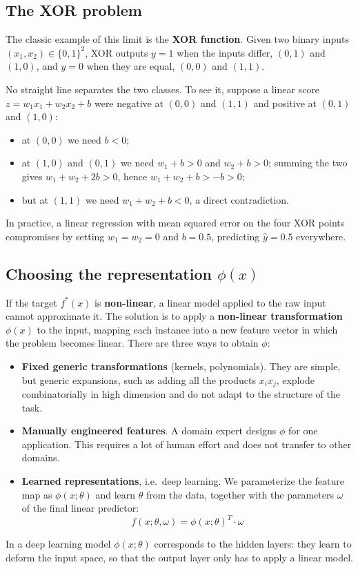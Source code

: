 \subsection{The XOR problem}
The classic example of this limit is the \textbf{XOR function}. Given two binary
inputs $(x_1, x_2) \in \{0,1\}^2$, XOR outputs $y = 1$ when the inputs differ,
$(0,1)$ and $(1,0)$, and $y = 0$ when they are equal, $(0,0)$ and $(1,1)$.

No straight line separates the two classes. To see it, suppose a linear score
$z = w_1 x_1 + w_2 x_2 + b$ were negative at $(0,0)$ and $(1,1)$ and positive at
$(0,1)$ and $(1,0)$:
\begin{itemize}
    \item at $(0,0)$ we need $b < 0$;
    \item at $(1,0)$ and $(0,1)$ we need $w_1 + b > 0$ and $w_2 + b > 0$; summing
          the two gives $w_1 + w_2 + 2b > 0$, hence $w_1 + w_2 + b > -b > 0$;
    \item but at $(1,1)$ we need $w_1 + w_2 + b < 0$, a direct contradiction.
\end{itemize}
In practice, a linear regression with mean squared error on the four XOR points
compromises by setting $w_1 = w_2 = 0$ and $b = 0.5$, predicting $\hat{y} = 0.5$
everywhere.

\subsection{Choosing the representation $\phi(x)$}
If the target $f^*(x)$ is \textbf{non-linear}, a linear model applied to the raw
input cannot approximate it. The solution is to apply a \textbf{non-linear
transformation} $\phi(x)$ to the input, mapping each instance into a new feature
vector in which the problem becomes linear. There are three ways to obtain $\phi$:
\begin{itemize}
    \item \textbf{Fixed generic transformations} (kernels, polynomials). They are
          simple, but generic expansions, such as adding all the products
          $x_i x_j$, explode combinatorially in high dimension and do not adapt to
          the structure of the task.
    \item \textbf{Manually engineered features}. A domain expert designs $\phi$ for
          one application. This requires a lot of human effort and does not
          transfer to other domains.
    \item \textbf{Learned representations}, i.e.\ deep learning. We parameterize
          the feature map as $\phi(x; \theta)$ and learn $\theta$ from the data,
          together with the parameters $\omega$ of the final linear predictor:
          \begin{equation}
              f(x; \theta, \omega) = \phi(x; \theta)^T \cdot \omega
          \end{equation}
\end{itemize}
\begin{note}
    In a deep learning model $\phi(x; \theta)$ corresponds to the hidden layers:
    they learn to deform the input space, so that the output layer only has to
    apply a linear model.
\end{note}

